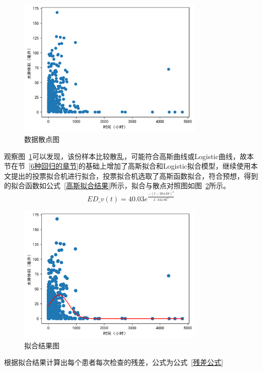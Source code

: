 \documentclass[bwprint]{gmcmthesis}
\begin{document}
\begin{figure}[!h]
\centering
\includegraphics[width=0.8\textwidth]{fig_me/q21散点图.png}
\caption{数据散点图}
\label{数据散点图}
\end{figure}

观察图~\ref{数据散点图}可以发现，该份样本比较散乱，可能符合高斯曲线或Logistic曲线，故本节在节~\ref{6种回归的章节}的基础上增加了高斯拟合和Logistic拟合模型，继续使用本文提出的投票拟合机进行拟合，投票拟合机选取了高斯函数拟合，符合预想，得到的拟合函数如公式~\ref{高斯拟合结果}所示，拟合与散点对照图如图~\ref{拟合结果图}所示。
\begin{equation}\label{高斯拟合结果}
ED\_v(t)=40.03e^{\frac{-(t - 384.68)^2} { 2 \cdot 342.06 ^2}}
\end{equation}
\begin{figure}[!h]
\centering
\includegraphics[width=0.8\textwidth]{fig_me/q21拟合结果图.png}
\caption{拟合结果图}
\label{拟合结果图}
\end{figure}
根据拟合结果计算出每个患者每次检查的残差，公式为公式~\ref{残差公式}
\end{document}
